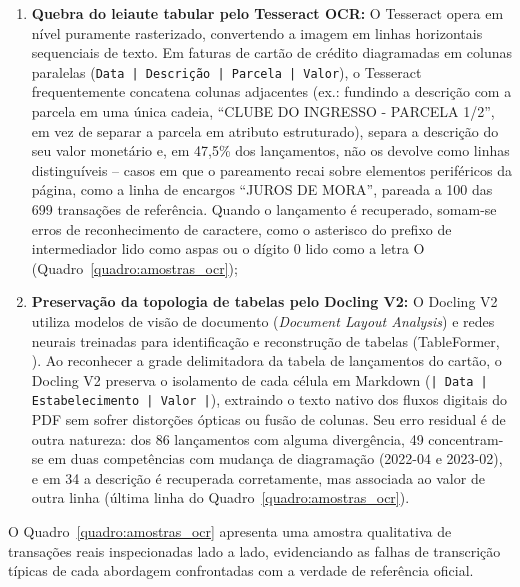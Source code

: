 \begin{enumerate}
	\item \textbf{Quebra do leiaute tabular pelo Tesseract OCR:} O Tesseract opera em nível puramente rasterizado, convertendo a imagem em linhas horizontais sequenciais de texto. Em faturas de cartão de crédito diagramadas em colunas paralelas (\texttt{Data | Descrição | Parcela | Valor}), o Tesseract frequentemente concatena colunas adjacentes (ex.: fundindo a descrição com a parcela em uma única cadeia, ``CLUBE DO INGRESSO - PARCELA 1/2'', em vez de separar a parcela em atributo estruturado), separa a descrição do seu valor monetário e, em 47,5\% dos lançamentos, não os devolve como linhas distinguíveis -- casos em que o pareamento recai sobre elementos periféricos da página, como a linha de encargos ``JUROS DE MORA'', pareada a 100 das 699 transações de referência. Quando o lançamento é recuperado, somam-se erros de reconhecimento de caractere, como o asterisco do prefixo de intermediador lido como aspas ou o dígito 0 lido como a letra O (Quadro~\ref{quadro:amostras_ocr});
	\item \textbf{Preservação da topologia de tabelas pelo Docling V2:} O Docling V2 utiliza modelos de visão de documento (\textit{Document Layout Analysis}) e redes neurais treinadas para identificação e reconstrução de tabelas (TableFormer, ). Ao reconhecer a grade delimitadora da tabela de lançamentos do cartão, o Docling V2 preserva o isolamento de cada célula em Markdown (\texttt{| Data | Estabelecimento | Valor |}), extraindo o texto nativo dos fluxos digitais do PDF sem sofrer distorções ópticas ou fusão de colunas. Seu erro residual é de outra natureza: dos 86 lançamentos com alguma divergência, 49 concentram-se em duas competências com mudança de diagramação (2022-04 e 2023-02), e em 34 a descrição é recuperada corretamente, mas associada ao valor de outra linha (última linha do Quadro~\ref{quadro:amostras_ocr}).
\end{enumerate}

O Quadro~\ref{quadro:amostras_ocr} apresenta uma amostra qualitativa de transações reais inspecionadas lado a lado, evidenciando as falhas de transcrição típicas de cada abordagem confrontadas com a verdade de referência oficial.

